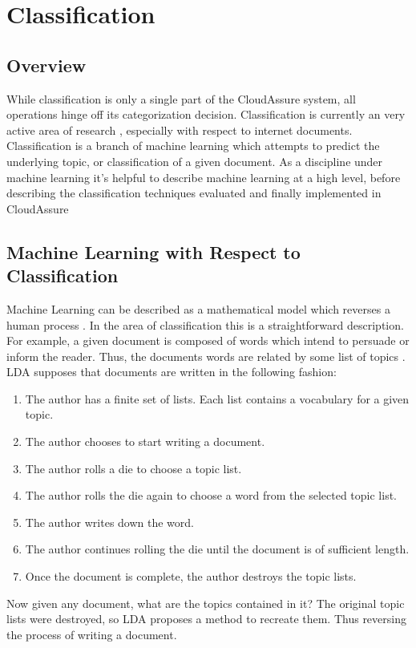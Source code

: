 \section{Classification}
\subsection{Overview}
While classification is only a single part of the CloudAssure system, all
operations hinge off its categorization decision. Classification is currently an
very active area of research \autocite{Zhang2000}, especially with respect to
internet documents. Classification is a branch of machine learning which
attempts to predict the underlying topic, or classification of a given document.
As a discipline under machine learning it's helpful to describe machine learning
at a high level, before describing the classification techniques evaluated and
finally implemented in CloudAssure

\subsection{Machine Learning with Respect to Classification}
Machine Learning can be described as a mathematical model which reverses a human
process \autocite{Bishop2009}. In the area of classification this is
a straightforward description. For example, a given document is composed of words which
intend to persuade or inform the reader. Thus, the documents words are related
by some list of topics \autocite{Blei2009}. \gls{LDA} supposes that documents are
written in the following fashion:
\begin{enumerate}
    \item The author has a finite set of lists. Each list contains a vocabulary
        for a given topic.
    \item The author chooses to start writing a document.
    \item The author rolls a die to choose a topic list.
    \item The author rolls the die again to choose a word from the selected
        topic list.
    \item The author writes down the word.
    \item The author continues rolling the die until the document is of sufficient
        length.
    \item Once the document is complete, the author destroys the topic lists.
\end{enumerate}
Now given any document, what are the topics contained in it? The original topic
lists were destroyed, so \gls{LDA} proposes a method to recreate them. Thus reversing
the process of writing a document.

